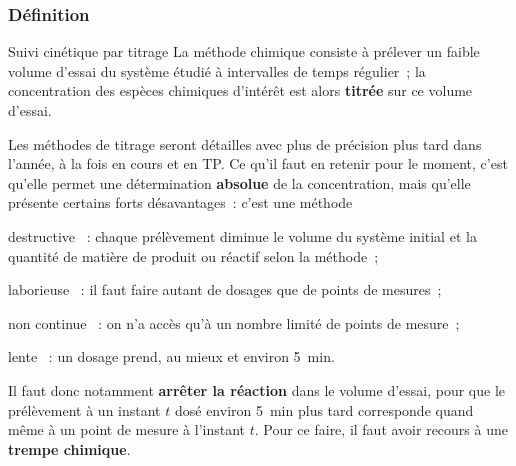 \documentclass[../main/main.tex]{subfiles}
\begin{document}
\subsubsection{Définition}
\begin{defi}[label=def:titrage]{Suivi cinétique par titrage}
    La méthode chimique consiste à prélever un faible volume d'essai du système
    étudié à intervalles de temps régulier~; la concentration des espèces
    chimiques d'intérêt est alors \textbf{titrée} sur ce volume d'essai. 
\end{defi}
Les méthodes de titrage seront détailles avec plus de précision plus tard dans
l'année, à la fois en cours et en TP. Ce qu'il faut en retenir pour le moment,
c'est qu'elle permet une détermination \textbf{absolue} de la concentration,
mais qu'elle présente certains forts désavantages~: c'est une méthode
\begin{bolditemize}
    \item[destructive]~: chaque prélèvement diminue le volume du système
        initial et la quantité de matière de produit ou réactif selon la
        méthode~;
    \item[laborieuse]~: il faut faire autant de dosages que de points de
        mesures~;
    \item[non continue]~: on n'a accès qu'à un nombre limité de points de
        mesure~;
    \item[lente]~: un dosage prend, au mieux et environ \SI{5}{min}.
\end{bolditemize}
Il faut donc notamment \textbf{arrêter la réaction} dans le volume d'essai, pour
que le prélèvement à un instant $t$ dosé environ \SI{5}{min} plus tard
corresponde quand même à un point de mesure à l'instant $t$. Pour ce faire, il
faut avoir recours à une \textbf{trempe chimique}.
\end{document}
